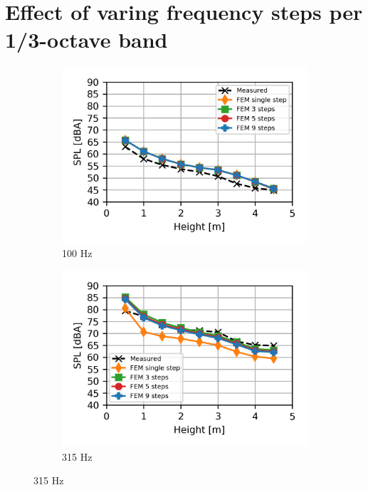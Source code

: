 \section{Effect of varing frequency steps per 1/3-octave band}

\begin{figure}[H]
	\centering
	\begin{subfigure}[b]{0.49\textwidth}
		\centering
		\includegraphics{fig/chap5/freq_steps/third_octave_over_height/100_Hz.png}
		\caption{100 Hz}
	\end{subfigure}
	\begin{subfigure}[b]{0.49\textwidth}
		\centering
		\includegraphics{fig/chap5/freq_steps/third_octave_over_height/315_Hz.png}
		\caption{315 Hz}
	\end{subfigure}

\end{figure}
